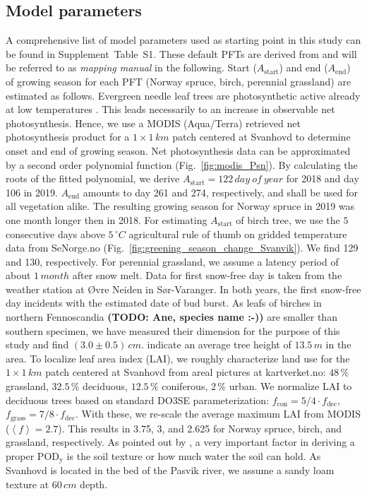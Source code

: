 \documentclass[bg, manuscript]{copernicus}
\begin{document}
\subsection{Model parameters}
A comprehensive list of model parameters used as starting point in this study can be found in Supplement~Table~S1. These default PFTs are derived from \citet{ICP:MappingManual2017} and will be referred to as \emph{mapping manual} in the following. Start ($A_\text{start}$) and end ($A_\text{end}$) of growing season for each PFT (Norway spruce, birch, perennial grassland) are estimated as follows. Evergreen needle leaf trees are photosynthetic active already at low temperatures \citep{TB:Kolari2007}. This leads necessarily to an increase in observable net photosynthesis. Hence, we use a MODIS (Aqua/Terra) retrieved net photosynthesis product for a $1\times 1\,\unit{km}$ patch centered at Svanhovd to determine onset and end of growing season. Net photosynthesis data can be approximated by a second order polynomial function (Fig.~\ref{fig:modis_Psn}). By calculating the roots of the fitted polynomial, we derive $A_\text{start} = 122\,\unit{day~of~year}$ for 2018 and day 106 in 2019. $A_\text{end}$ amounts to day 261 and 274, respectively, and shall be used for all vegetation alike. The resulting growing season for Norway spruce in 2019 was one month longer then in 2018. For estimating $A_\text{start}$ of birch tree, we use the $5$ consecutive days above $5\,\unit{^\circ C}$ agricultural rule of thumb on gridded temperature data from SeNorge.no (Fig.~\ref{fig:greening_season_change_Svanvik}). We find 129 and 130, respectively. For perennial grassland, we assume a latency period of about $1\,\unit{month}$ after snow melt. Data for first snow-free day is taken from the weather station at Øvre Neiden in Sør-Varanger. In both years, the first snow-free day incidents with the estimated date of bud burst. As leafs of birches in northern Fennoscandia {\bf (TODO: Ane, species name :-))} are smaller than southern specimen, we have measured their dimension for the purpose of this study and find $(3.0\pm 0.5)\,\unit{cm}$. \citet[][p.~52]{NINA2004} indicate an average tree height of $13.5\,\unit{m}$ in the area. To localize leaf area index (LAI), we roughly characterize land use for the $1\times 1\,\unit{km}$ patch centered at Svanhovd from areal pictures at kartverket.no: $48\,\unit{\%}$ grassland, $32.5\,\unit{\%}$ deciduous, $12.5\,\unit{\%}$ coniferous, $2\,\unit{\%}$ urban. We normalize LAI to deciduous trees based on standard DO3SE parameterization: $f_\text{con}=5/4\cdot f_\text{dec}$, $f_\text{grass}=7/8\cdot f_\text{dec}$. With these, we re-scale the average maximum LAI from MODIS ($\left<f\right> = 2.7$). This results in 3.75, 3, and 2.625 for Norway spruce, birch, and grassland, respectively.
As pointed out by \citet{ACP:Bueker2012}, a very important factor in deriving a proper $\mathrm{POD_y}$ is the soil texture or how much water the soil can hold. As Svanhovd is located in the bed of the Pasvik river, we assume a sandy loam texture at $60\,\unit{cm}$ depth.\\
\end{document}
